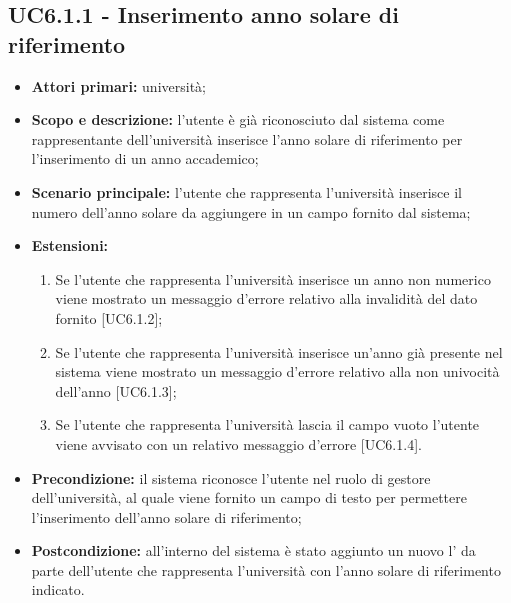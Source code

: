 \documentclass[AnalisiDeiRequisiti.tex]{subfiles}
\begin{document}
\subsection{UC6.1.1 - Inserimento anno solare di riferimento}
	\begin{itemize}
	\item \textbf{Attori primari:} università;
	\item \textbf{Scopo e descrizione:} l'utente è già riconosciuto dal sistema come rappresentante dell'università inserisce l'anno solare di riferimento per l'inserimento di un anno accademico;
	\item \textbf{Scenario principale:} l'utente che rappresenta l'università inserisce il numero dell'anno solare da aggiungere in un campo fornito dal sistema;
	\item \textbf{Estensioni:}
	\begin{enumerate}
		\item Se l'utente che rappresenta l'università inserisce un anno non numerico viene mostrato un messaggio d'errore relativo alla invalidità del dato fornito [UC6.1.2];
		\item Se l'utente che rappresenta l'università inserisce un'anno già presente nel sistema viene mostrato un messaggio d'errore relativo alla non univocità dell'anno [UC6.1.3];
		\item Se l'utente che rappresenta l'università lascia il campo vuoto l'utente viene avvisato con un relativo messaggio d'errore [UC6.1.4].
	\end{enumerate}
	\item \textbf{Precondizione:} il sistema riconosce l'utente nel ruolo di gestore dell'università, al quale viene fornito un campo di testo per permettere l'inserimento dell'anno solare di riferimento; 
	\item \textbf{Postcondizione:} all'interno del sistema è stato aggiunto un nuovo l' da parte dell'utente che rappresenta l'università con l'anno solare di riferimento indicato.
\end{itemize}
\end{document}

